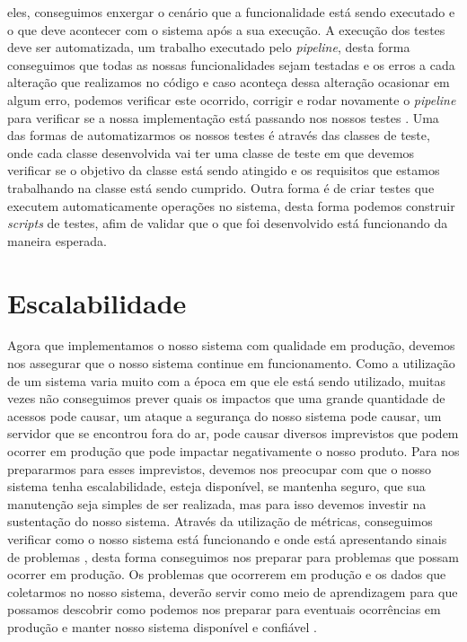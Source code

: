         eles, conseguimos enxergar o cenário que a funcionalidade está sendo executado
        e o que deve acontecer com o sistema após a sua execução. \newline
        A execução dos testes deve ser automatizada, um trabalho executado pelo
        \textit{pipeline}, desta forma conseguimos que todas as nossas funcionalidades
        sejam testadas e os erros a cada alteração que realizamos no código e caso
        aconteça dessa alteração ocasionar em algum erro, podemos verificar este
        ocorrido, corrigir e rodar novamente o \textit{pipeline} para verificar se
        a nossa implementação está passando nos nossos testes \cite{ContinuousDelivery}.
        Uma das formas de automatizarmos os nossos testes é através das classes de
        teste, onde cada classe desenvolvida vai ter uma classe de teste em que
        devemos verificar se o objetivo da classe está sendo atingido e os requisitos
        que estamos trabalhando na classe está sendo cumprido. Outra forma é de criar
        testes que executem automaticamente operações no sistema, desta forma podemos
        construir \textit{scripts} de testes, afim de validar que o que foi desenvolvido
        está funcionando da maneira esperada. \newline

      \section{Escalabilidade}
        Agora que implementamos o nosso sistema com qualidade em produção, devemos
        nos assegurar que o nosso sistema continue em funcionamento. Como a utilização
        de um sistema varia muito com a época em que ele está sendo utilizado, muitas
        vezes não conseguimos prever quais os impactos que uma grande quantidade de
        acessos pode causar, um ataque a segurança do nosso sistema pode causar,
        um servidor que se encontrou fora do ar, pode causar diversos imprevistos
        que podem ocorrer em produção que pode impactar negativamente o nosso
        produto. \newline
        Para nos prepararmos para esses imprevistos, devemos nos preocupar com que
        o nosso sistema tenha escalabilidade, esteja disponível, se mantenha
        seguro, que sua manutenção seja simples de ser realizada, mas para isso
        devemos investir na sustentação do nosso sistema. Através da utilização
        de métricas, conseguimos verificar como o nosso sistema está funcionando e
        onde está apresentando sinais de problemas \cite{TheDevOpsHandbook}, desta
        forma conseguimos nos preparar para problemas que possam ocorrer em produção.
        Os problemas que ocorrerem em produção e os dados que coletarmos no nosso
        sistema, deverão servir como meio de aprendizagem para que possamos descobrir
        como podemos nos preparar para eventuais ocorrências em produção e manter
        nosso sistema disponível e confiável \cite{SiteReliabilityEngineering}.

